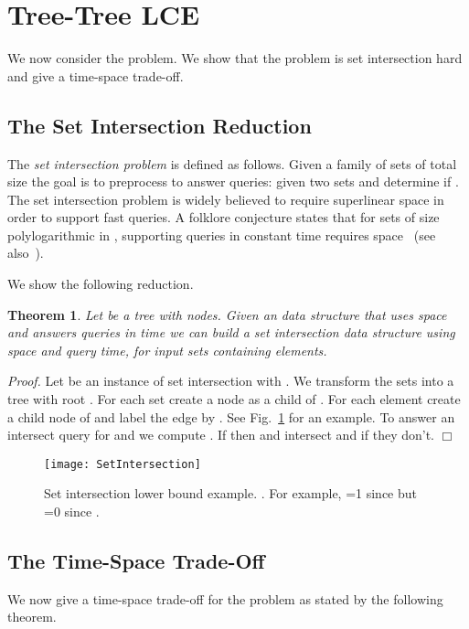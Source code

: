 \documentclass [10pt]{article}
\newtheorem{theorem}{Theorem}
\newcommand{\qed}{\hfill\ensuremath{\Box}\medskip\\\noindent}
\newenvironment{proof}{\noindent\emph{Proof. }}{}
\begin{document}
\section{Tree-Tree LCE} 
We now consider the  problem. We show that the problem is set intersection hard and give a time-space trade-off. 

\subsection{The Set Intersection Reduction}
The \emph{set intersection problem} is defined as follows. Given a family  of sets of total size  the goal is to preprocess  to answer queries: given two sets  and  determine if . The set intersection problem is widely believed to require superlinear space in order to support fast queries. A folklore conjecture states that for sets of size polylogarithmic in , supporting queries in constant time requires  space~\cite{PR2014} (see also~\cite{CP2010}).


We show the following reduction. 
\begin{theorem}
Let  be a tree with  nodes. Given an  data structure that uses  space and answers queries in  time we can build a set intersection data structure using  space and  query time, for input sets containing  elements.
\end{theorem}
\begin{proof}
Let  be an instance of set intersection with . We transform the sets into a tree  with root . For each set  create a node  as a child of . For each element  create a child node of  and label the edge by . See Fig.~\ref{fig:setintersection} for an example. To answer an intersect query for  and  we compute . If  then  and  intersect and if  they don't. \qed
\end{proof}
\begin{figure}
\begin{center}
\texttt{[image: SetIntersection]}
\end{center}
\caption{Set intersection lower bound example.  . For example, =1 since   but =0 since  . }
\label{fig:setintersection}
\end{figure}


\subsection{The Time-Space Trade-Off} 
We now give a time-space trade-off for the  problem as stated by the following theorem. 
\end{document}
